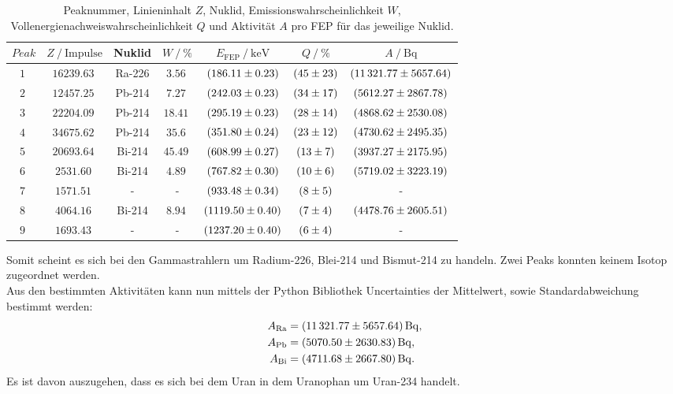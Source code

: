 \begin{table}
    \centering
    \caption{Peaknummer, Linieninhalt $Z$, Nuklid, Emissionswahrscheinlichkeit $W$, Vollenergienachweiswahrscheinlichkeit $Q$ und Aktivität $A$ pro FEP für das jeweilige Nuklid\cite{Uran_Zerfall}.}
    \label{tab:Barium}
    \begin{tabular}{c c c c c c c}
      \toprule
      $Peak$ & $Z \mathbin{/} \mathrm{Impulse}$ & Nuklid & $W \mathbin{/} \% $ & $E_{\mathrm{FEP}} \mathbin{/} \unit{\kilo\electronvolt}$ & $Q \mathbin{/} \%$ & $A \mathbin{/} \unit{\becquerel}$ \\
      \midrule
      $\qty{1}{}$ & $\qty{16239.63}{}$   & Ra-226 & $\qty{3.56}{}$  & $\qty{186.11 \pm 0.23}{}$ & $\qty{45 \pm 23}{}$ & $\qty{11321.77 \pm 5657.64}{}$ \\
      $\qty{2}{}$ & $\qty{12457.25}{}$   & Pb-214 & $\qty{7.27}{}$  & $\qty{242.03 \pm 0.23}{}$ & $\qty{34 \pm 17}{}$ & $\qty{5612.27 \pm 2867.78}{}$ \\
      $\qty{3}{}$ & $\qty{22204.09}{}$   & Pb-214 & $\qty{18.41}{}$ & $\qty{295.19 \pm 0.23}{}$ & $\qty{28 \pm 14}{}$ & $\qty{4868.62 \pm 2530.08}{}$ \\
      $\qty{4}{}$ & $\qty{34675.62}{}$   & Pb-214 & $\qty{35.6}{}$  & $\qty{351.80 \pm 0.24}{}$ & $\qty{23 \pm 12}{}$ & $\qty{4730.62 \pm 2495.35}{}$ \\
      $\qty{5}{}$ & $\qty{20693.64}{}$   & Bi-214 & $\qty{45.49}{}$ & $\qty{608.99 \pm 0.27}{}$ & $\qty{13 \pm 7}{}$  & $\qty{3937.27 \pm 2175.95}{}$ \\
      $\qty{6}{}$ & $\qty{2531.60}{}$    & Bi-214 & $\qty{4.89}{}$  & $\qty{767.82 \pm 0.30}{}$ & $\qty{10 \pm 6}{}$  & $\qty{5719.02 \pm 3223.19}{}$ \\
      $\qty{7}{}$ & $\qty{1571.51}{}$    & -      & -               & $\qty{933.48 \pm 0.34}{}$ & $\qty{8 \pm 5}{}$   & - \\
      $\qty{8}{}$ & $\qty{4064.16}{}$    & Bi-214 & $\qty{8.94}{}$  & $\qty{1119.50 \pm 0.40}{}$ & $\qty{7 \pm 4}{}$  & $\qty{4478.76 \pm 2605.51}{}$ \\
      $\qty{9}{}$ & $\qty{1693.43}{}$    & -      & -               & $\qty{1237.20 \pm 0.40}{}$ & $\qty{6 \pm 4}{}$  & - \\
      \bottomrule
    \end{tabular}
\end{table}
Somit scheint es sich bei den Gammastrahlern um Radium-226, Blei-214 und Bismut-214 zu handeln. Zwei Peaks konnten keinem Isotop zugeordnet werden.\\
Aus den bestimmten Aktivitäten kann nun mittels der Python Bibliothek Uncertainties\cite{uncertainties} der Mittelwert, sowie Standardabweichung bestimmt werden:
\begin{align}
    A_{\mathrm{Ra}} &= \qty{11321.77 \pm 5657.64}{\becquerel},\\
    A_{\mathrm{Pb}} &= \qty{5070.50 \pm 2630.83}{\becquerel},\\
    A_{\mathrm{Bi}} &= \qty{4711.68 \pm 2667.80}{\becquerel}.
\end{align}
Es ist davon auszugehen, dass es sich bei dem Uran in dem Uranophan um Uran-234 handelt.